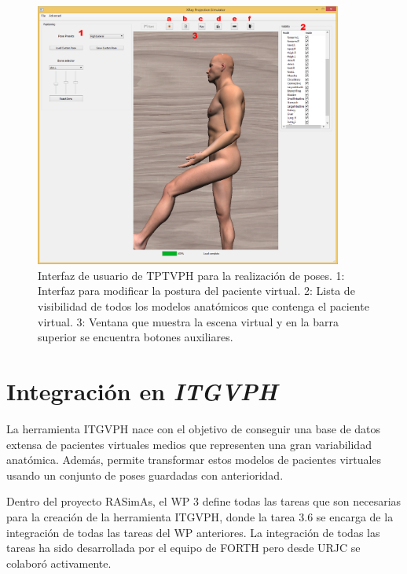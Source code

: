 \begin{figure}
    \centering
    \includegraphics[width=0.9\textwidth]{IMG/posingui.png}
    \caption{Interfaz de usuario de \ac{TPTVPH} para la realización de poses. 1: Interfaz para modificar la postura del paciente virtual. 2: Lista de visibilidad de todos los modelos anatómicos que contenga el paciente virtual. 3: Ventana que muestra la escena virtual y en la barra superior se encuentra botones auxiliares.}
    \label{fig:posui}
\end{figure}




\section{Integración en  \emph{ITGVPH}}
\label{rasim:herramienta}

La herramienta \ac{ITGVPH} nace con el objetivo de conseguir una base de datos extensa de pacientes virtuales medios que representen una gran variabilidad anatómica. Además, permite transformar estos modelos de pacientes virtuales usando un conjunto de poses guardadas con anterioridad. %

Dentro del proyecto \ac{RASimAs}, el \ac{WP} 3 define todas las tareas que son necesarias para la creación de la herramienta \ac{ITGVPH}, donde la tarea 3.6 se encarga de la integración
de todas las tareas del \acs{WP} anteriores. La integración de todas las tareas ha sido desarrollada por el equipo de \ac{FORTH} pero desde \ac{URJC} se colaboró activamente. 

